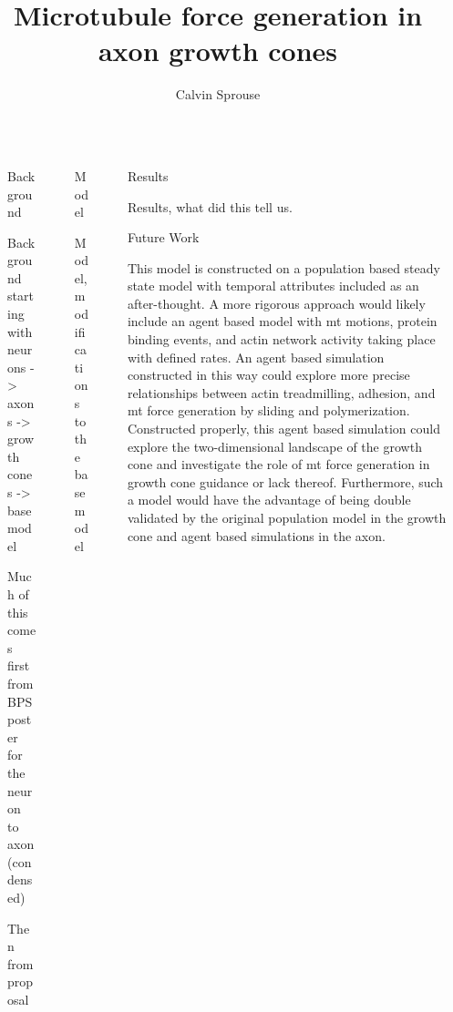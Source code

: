 \documentclass[final]{beamer}
\title{Microtubule force generation in axon growth cones}
\author{Calvin Sprouse}
\institute[CWU]{Department of Physics, Central Washington University}
\newlength{\sepwidth}
\newlength{\colwidth}
\newcommand{\separatorcolumn}{\begin{column}{\sepwidth}\end{column}}
\begin{document}
\begin{frame}[t]
\begin{columns}[t]
\separatorcolumn%


\begin{column}{\colwidth}

\begin{block}{Background}
\end{block}

Background starting with neurons -> axons -> growth cones -> base model

Much of this comes first from BPS poster for the neuron to axon (condensed)

Then from proposal

\end{column}
\separatorcolumn%


\begin{column}{\colwidth}

\begin{block}{Model}

Model, modifications to the base model

\end{block}

\end{column}
\separatorcolumn%


\begin{column}{\colwidth}

\begin{block}{Results}

Results, what did this tell us.

\end{block}

\begin{block}{Future Work}

This model is constructed on a population based steady state model with temporal attributes included as an after-thought. A more rigorous approach would likely include an agent based model with mt motions, protein binding events, and actin network activity taking place with defined rates. An agent based simulation constructed in this way could explore more precise relationships between actin treadmilling, adhesion, and mt force generation by sliding and polymerization. Constructed properly, this agent based simulation could explore the two-dimensional landscape of the growth cone and investigate the role of mt force generation in growth cone guidance or lack thereof. Furthermore, such a model would have the advantage of being double validated by the original population model in the growth cone and agent based simulations in the axon.


\end{block}
\end{column}
\end{columns}
\end{frame}
\end{document}

